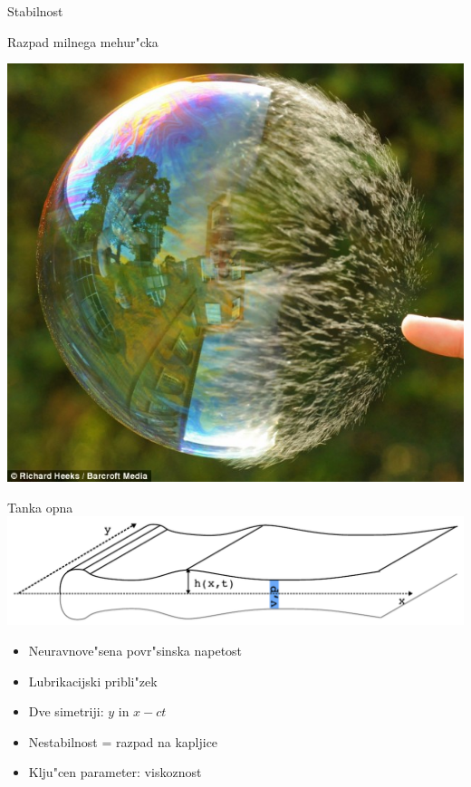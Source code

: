 \documentclass{beamer}
\begin{document}
\begin{frame}{Stabilnost}
 
\end{frame}

\begin{frame}{Razpad milnega mehur"cka}
\begin{center}
 \includegraphics[width=.8\textwidth]{./Slike/bubble-3}
\end{center}
\end{frame}

\begin{frame}{Tanka opna}
 \includegraphics[width=.8\textwidth]{./Slike/mehurcek-skica}
 \begin{itemize}
  \item Neuravnove"sena povr"sinska napetost
  \item Lubrikacijski pribli"zek
  \item Dve simetriji: $y$ in $x-ct$
  \item Nestabilnost = razpad na kapljice
  \item Klju"cen parameter: viskoznost
 \end{itemize}

\end{frame}
\end{document}
